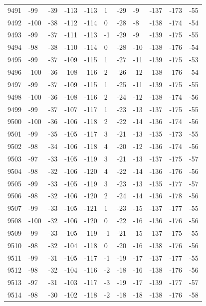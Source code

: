 \begin{table}[H]
\begin{tabular}{lllllllllll}
9491 & -99 & -39 & -113 & -113 & 1 & -29 & -9 & -137 & -173 & -55 \\
9492 & -100 & -38 & -112 & -114 & 0 & -28 & -8 & -138 & -174 & -54 \\
9493 & -99 & -37 & -111 & -113 & -1 & -29 & -9 & -139 & -175 & -55 \\
9494 & -98 & -38 & -110 & -114 & 0 & -28 & -10 & -138 & -176 & -54 \\
9495 & -99 & -37 & -109 & -115 & 1 & -27 & -11 & -139 & -175 & -53 \\
9496 & -100 & -36 & -108 & -116 & 2 & -26 & -12 & -138 & -176 & -54 \\
9497 & -99 & -37 & -109 & -115 & 1 & -25 & -11 & -139 & -175 & -55 \\
9498 & -100 & -36 & -108 & -116 & 2 & -24 & -12 & -138 & -174 & -56 \\
9499 & -99 & -37 & -107 & -117 & 1 & -23 & -13 & -137 & -175 & -55 \\
9500 & -100 & -36 & -106 & -118 & 2 & -22 & -14 & -136 & -174 & -56 \\
9501 & -99 & -35 & -105 & -117 & 3 & -21 & -13 & -135 & -173 & -55 \\
9502 & -98 & -34 & -106 & -118 & 4 & -20 & -12 & -136 & -174 & -56 \\
9503 & -97 & -33 & -105 & -119 & 3 & -21 & -13 & -137 & -175 & -57 \\
9504 & -98 & -32 & -106 & -120 & 4 & -22 & -14 & -136 & -176 & -56 \\
9505 & -99 & -33 & -105 & -119 & 3 & -23 & -13 & -135 & -177 & -57 \\
9506 & -98 & -32 & -106 & -120 & 2 & -24 & -14 & -136 & -178 & -56 \\
9507 & -99 & -33 & -105 & -121 & 1 & -23 & -15 & -137 & -177 & -55 \\
9508 & -100 & -32 & -106 & -120 & 0 & -22 & -16 & -136 & -176 & -56 \\
9509 & -99 & -33 & -105 & -119 & -1 & -21 & -15 & -137 & -175 & -55 \\
9510 & -98 & -32 & -104 & -118 & 0 & -20 & -16 & -138 & -176 & -56 \\
9511 & -99 & -31 & -105 & -117 & -1 & -19 & -17 & -137 & -177 & -55 \\
9512 & -98 & -32 & -104 & -116 & -2 & -18 & -16 & -138 & -176 & -56 \\
9513 & -97 & -31 & -103 & -117 & -3 & -19 & -17 & -139 & -177 & -57 \\
9514 & -98 & -30 & -102 & -118 & -2 & -18 & -18 & -138 & -176 & -58 \\

\end{tabular}
\end{table}
